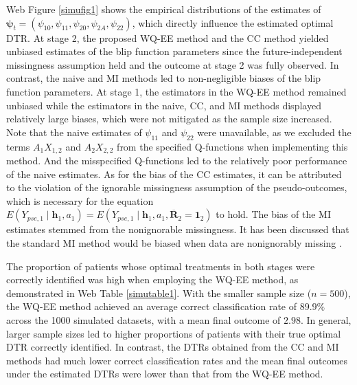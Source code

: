 \documentclass[12pt]{article}
\begin{document}
Web Figure \ref{simufig1} shows the empirical distributions of the estimates of $\bm{\psi}_t= (\psi_{10},\psi_{11}, \psi_{20},\psi_{2A},\psi_{22})$, which directly influence the estimated optimal DTR. At stage 2, the proposed WQ-EE method and the CC method yielded unbiased estimates of the blip function parameters since the future-independent missingness assumption held and the outcome at stage 2 was fully observed. In contrast, the naive and MI methods led to non-negligible biases of the blip function parameters. At stage 1, the estimators in the WQ-EE method remained unbiased while the estimators in the naive, CC, and MI methods displayed relatively large biases, which were not mitigated as the sample size increased. Note that the naive estimates of $\psi_{11}$ and $\psi_{22}$ were unavailable, as we excluded the terms $A_1X_{1,2}$ and $A_2X_{2,2}$ from the specified Q-functions when implementing this method. And the misspecified Q-functions led to the relatively poor performance of the naive estimates. As for the bias of the CC estimates, 
it can be attributed to the violation of the ignorable missingness assumption of the pseudo-outcomes, which is necessary for the equation $E(Y_{pse,1}\mid \bm{h}_1,a_1) = E(Y_{pse,1}\mid \bm{h}_1,a_1,\overline{\bm{R}}_2 = \bm{1}_2)$ to hold. 
The bias of the MI estimates stemmed from the nonignorable missingness. It has been discussed that the standard MI method would be biased when data are nonignorably missing \citep{schafer2002missing}.  

The proportion of patients whose optimal treatments in both stages were correctly identified was high when employing the WQ-EE method, as demonstrated in Web Table \ref{simutable1}. With the smaller sample size ($n=500$), the WQ-EE method achieved an average correct classification rate of $89.9\%$ across the 1000 simulated datasets, with a mean final outcome of $2.98$. In general, larger sample sizes led to higher proportions of patients with their true optimal DTR correctly identified. In contrast, the DTRs obtained from the CC and MI methods had much lower correct classification rates and the mean final outcomes under the estimated DTRs were lower than that from the WQ-EE method. 
\end{document}
